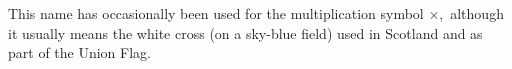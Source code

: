 This name has occasionally been used for the multiplication
symbol \ensuremath{ \times ,} although it usually means the white cross
(on a sky-blue field) used in Scotland and as part of the 
Union Flag.